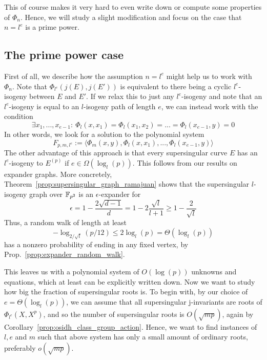 This of course makes it very hard to even write down or compute some properties of $\Phi_n$.
Hence, we will study a slight modification and focus on the case that $n = l^e$ is a prime power.

\subsection{The prime power case}
First of all, we describe how the assumption $n = l^e$ might help us to work with $\Phi_n$.
Note that $\Phi_{l^e}(j(E), j(E'))$ is equivalent to there being a cyclic $l^e$-isogeny between $E$ and $E'$.
If we relax this to just any $l^e$-isogeny and note that an $l^e$-isogeny is equal to an $l$-isogeny path of length $e$, we can instead work with the condition
\begin{equation*}
    \exists x_1, ..., x_{e - 1}: \ \Phi_l(x, x_1) = \Phi_l(x_1, x_2) = ... = \Phi_l(x_{e - 1}, y) = 0
\end{equation*}
In other words, we look for a solution to the polynomial system
\begin{equation*}
    F_{p, m, l^e} := \langle \Phi_m(x, y), \Phi_l(x, x_1), ..., \Phi_l(x_{e - 1}, y) \rangle
\end{equation*}
The other advantage of this approach is that every supersingular curve $E$ has an $l^e$-isogeny to $E^{(p)}$ if $e \in \Omega(\log_l(p))$.
This follows from our results on expander graphs.
More concretely, Theorem~\ref{prop:supersingular_graph_ramajuan} shows that the supersingular $l$-isogeny graph over $\mathbb{F}_{p^2}$ is an $\epsilon$-expander for
\begin{equation*}
    \epsilon = 1 - \frac {2\sqrt{d - 1}} d = 1 - 2 \frac {\sqrt{l}} {l + 1} \geq 1 - \frac 2 {\sqrt{l}}
\end{equation*}
Thus, a random walk of length at least
\begin{equation*}
    -\log_{2/\sqrt{l}}(p/12) \leq 2 \log_l(p) = \Theta(\log_l(p))
\end{equation*}
has a nonzero probability of ending in any fixed vertex, by Prop.~\ref{prop:expander_random_walk}.

This leaves us with a polynomial system of $O(\log(p))$ unknowns and equations, which at least can be explicitly written down.
Now we want to study how big the fraction of supersingular roots is.
To begin with, by our choice of $e = \Theta(\log_l(p))$, we can assume that all supersingular j-invariants are roots of $\Phi_{l^e}(X, X^p)$, and so the number of supersingular roots is $O(\sqrt{mp})$, again by Corollary~\ref{prop:osidh_class_group_action}.
Hence, we want to find instances of $l, e$ and $m$ such that above system has only a small amount of ordinary roots, preferably $o(\sqrt{mp})$. 

